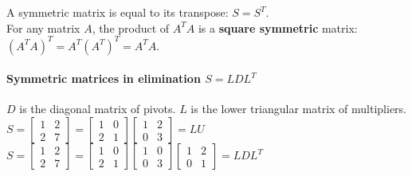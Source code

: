 A symmetric matrix is equal to its transpose: $S = S^T$. \\

\noindent For any matrix $A$, the product of $A^TA$ is a \textbf{square symmetric} matrix: $(A^TA)^T = A^T(A^T)^T = A^TA$.

\paragraph{Symmetric matrices in elimination $S = LDL^T$} $D$ is the diagonal matrix of pivots. $L$ is the lower triangular matrix of multipliers. \\

\noindent $S = \begin{bmatrix}
        1 & 2 \\
        2 & 7
    \end{bmatrix} =
    \begin{bmatrix}
        1 & 0 \\ 2 & 1
    \end{bmatrix}
    \begin{bmatrix}
        1 & 2 \\ 0 & 3
    \end{bmatrix} = LU
$ \\

\noindent $S = \begin{bmatrix}
        1 & 2 \\ 2 & 7
    \end{bmatrix} =
    \begin{bmatrix}
        1 & 0 \\ 2 & 1
    \end{bmatrix}
    \begin{bmatrix}
        1 & 0 \\ 0 & 3
    \end{bmatrix}
    \begin{bmatrix}
        1 & 2 \\ 0 & 1
    \end{bmatrix} = LDL^T
$